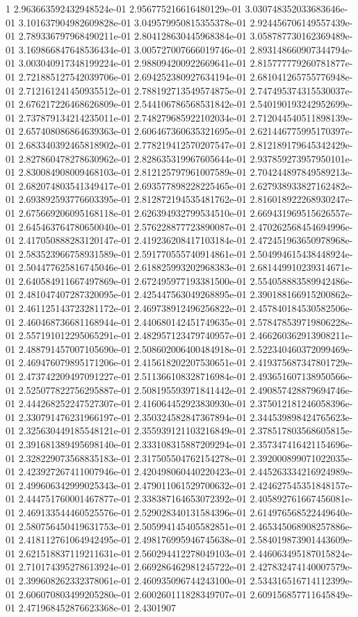 1	2.963663592432948524e-01	2.956775216616480129e-01	3.030748352033683646e-01	3.101637904982609828e-01	3.049579950815355378e-01	2.924456706149557439e-01	2.789336797968490211e-01	2.804128630445968384e-01	3.058787730162369489e-01	3.169866847648536434e-01	3.005727007666019746e-01	2.893148660907344794e-01	3.003040917348199224e-01	2.988094200922669641e-01	2.815777779260781877e-01	2.721885127542039706e-01	2.694252380927634194e-01	2.681041265755776948e-01	2.712161241450935512e-01	2.788192713549574875e-01	2.747495374315530037e-01	2.676217226468626809e-01	2.544106786568531842e-01	2.540190193242952699e-01	2.737879134214235011e-01	2.748279685922102034e-01	2.712044540511898139e-01	2.657408086864639363e-01	2.606467360635321695e-01	2.621446775995170397e-01	2.683340392465818902e-01	2.778219412570207547e-01	2.812189179645342429e-01	2.827860478278630962e-01	2.828635319967605644e-01	2.937859273957950101e-01	2.830084908009468103e-01	2.812125797961007589e-01	2.704244897849589213e-01	2.682074803541349417e-01	2.693577898228225465e-01	2.627938933827162482e-01	2.693892593776603395e-01	2.812872194535481762e-01	2.816018922268930247e-01	2.675669206095168118e-01	2.626394932799534510e-01	2.669431969515626557e-01	2.645463764780650040e-01	2.576228877723890087e-01	2.470262568454694996e-01	2.417050888283120147e-01	2.419236208417103184e-01	2.472451963650978968e-01	2.583523966758931589e-01	2.591770555740914861e-01	2.504994615438448924e-01	2.504477625816745046e-01	2.618825993202968383e-01	2.681449910239314671e-01	2.640584911667497869e-01	2.672495977193381500e-01	2.554058883589942486e-01	2.481047407287320095e-01	2.425447563049268895e-01	2.390188166915200862e-01	2.461125143723281172e-01	2.469738912496256822e-01	2.457840184530582506e-01	2.460468736681168944e-01	2.440680142451749635e-01	2.578478539719806228e-01	2.557191012295065291e-01	2.482957123479740957e-01	2.466260362913908211e-01	2.488791457007105690e-01	2.508602006400484918e-01	2.522340460372099469e-01	2.469476079895171206e-01	2.415618202207530651e-01	2.419375687347801729e-01	2.473742209497091227e-01	2.511366108328716984e-01	2.493651607138950566e-01	2.525077822756295887e-01	2.508195593971841442e-01	2.490857428879694746e-01	2.444268252247527307e-01	2.416064452923830930e-01	2.375012181246058396e-01	2.330791476231966197e-01	2.350324582847367894e-01	2.344539898424765623e-01	2.325630449185548121e-01	2.355939121103216849e-01	2.378517803568605815e-01	2.391681389495698140e-01	2.333108315887209294e-01	2.357347416421154696e-01	2.328229073568835183e-01	2.317505504762154278e-01	2.392000899071022035e-01	2.423927267411007946e-01	2.420498060440220423e-01	2.445263334216924989e-01	2.499606342999025343e-01	2.479011061529700632e-01	2.424627545351848157e-01	2.444751760001467877e-01	2.338387164653072392e-01	2.405892761667456081e-01	2.469133544460525576e-01	2.529028340131584396e-01	2.614976568522449640e-01	2.580756450419631753e-01	2.505994145405582851e-01	2.465345068908257886e-01	2.418112761064942495e-01	2.498176995946745638e-01	2.584019873901443609e-01	2.621518837119211631e-01	2.560294412278049103e-01	2.446063495187015824e-01	2.710174395278613924e-01	2.669286462981245722e-01	2.427832474140007579e-01	2.399608262332378061e-01	2.460935096744243100e-01	2.534316516714112399e-01	2.606070803499205280e-01	2.600260111828349707e-01	2.609156857711645849e-01	2.471968452876623368e-01	2.4301907
